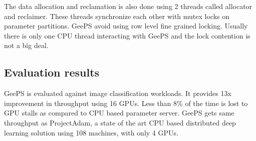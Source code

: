 \documentclass[11pt]{article}
\begin{document}
The data allocation and reclamation is also done using 2 threads called allocator and reclaimer. These threads synchronize each other with mutex locks on parameter partitions. GeePS avoid using row level fine grained locking. Usually there is only one CPU thread interacting with GeePS and the lock contention is not a big deal.
\subsection{Evaluation results}
\label{sec:orgdf9e3fa}
GeePS is evaluated against image classification workloads. It provides 13x improvement in throughput using 16 GPUs. Less than 8\% of the time is lost to GPU stalls as compared to CPU based parameter server. GeePS gets same throughput as ProjectAdam, a state of the art CPU based distributed deep learning solution using 108 machines, with only 4 GPUs.
\end{document}
